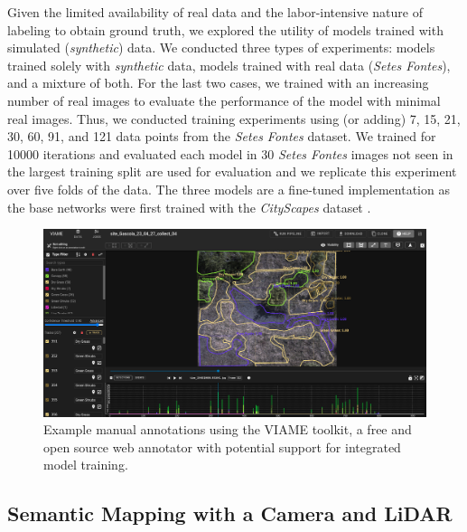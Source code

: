 Given the limited availability of real data and the labor-intensive nature of labeling to obtain ground truth, we explored the utility of models trained with simulated (\textit{synthetic}) data. We conducted three types of experiments: models trained solely with \textit{synthetic} data, models trained with real data (\textit{Setes Fontes}), and a mixture of both. For the last two cases, we trained with an increasing number of real images to evaluate the performance of the model with minimal real images. Thus, we conducted training experiments using (or adding) 7, 15, 21, 30, 60, 91, and 121 data points from the \textit{Setes Fontes} dataset. We trained for 10000 iterations and evaluated each model in 30 \textit{Setes Fontes} images not seen in the largest training split are used for evaluation and we replicate this experiment over five folds of the data. The three models are a fine-tuned implementation as the base networks were first trained with the \textit{CityScapes} dataset \cite{Cordts2016}.

\begin{figure}
    \centering
    \includegraphics[width=\textwidth]{figs/methods/semantic_mapping/viame_example.png}
    \caption{Example manual annotations using the VIAME toolkit, a free and open source web annotator with potential support for integrated model training.}
    \label{fig:methods:manual-annotations}
\end{figure}

\subsection{Semantic Mapping with a Camera and LiDAR}


